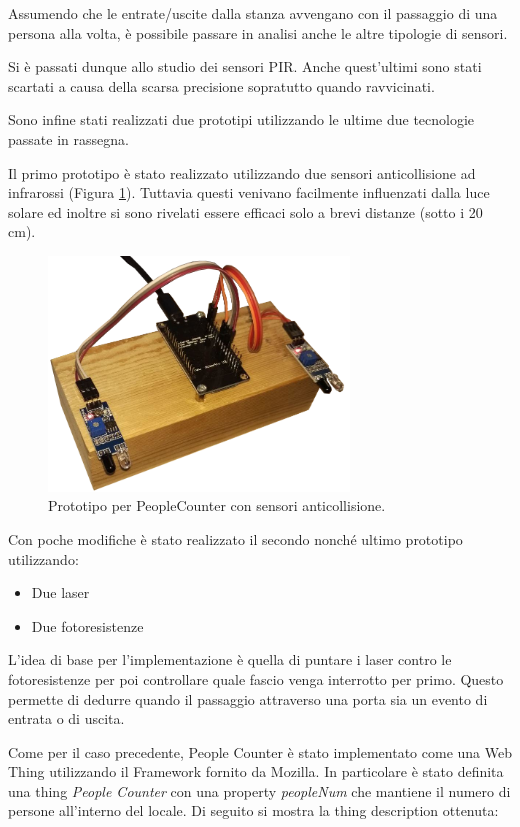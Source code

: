\documentclass{article}
\begin{document}
Assumendo che le entrate/uscite dalla stanza avvengano con il passaggio di una persona alla volta, è possibile passare in analisi anche le altre tipologie di sensori.

Si è passati dunque allo studio dei sensori PIR. Anche quest'ultimi sono stati scartati a causa della scarsa precisione sopratutto quando ravvicinati. 

Sono infine stati realizzati due prototipi utilizzando le ultime due tecnologie passate in rassegna.

Il primo prototipo è stato realizzato utilizzando due sensori anticollisione ad infrarossi (Figura \ref{fig:anticollision}).
Tuttavia questi venivano facilmente influenzati dalla luce solare ed inoltre si sono rivelati essere efficaci solo a brevi distanze (sotto i 20 cm).

\begin{figure}
    \centering
    \includegraphics[width=8cm]{img/ir_counter.png}
    \caption{Prototipo per PeopleCounter con sensori anticollisione.}
    \label{fig:anticollision}
\end{figure}

Con poche modifiche è stato realizzato il secondo nonché ultimo prototipo utilizzando:
\begin{itemize}
    \item Due laser
    \item Due fotoresistenze
\end{itemize}

L'idea di base per l'implementazione è quella di puntare i laser contro le fotoresistenze per poi controllare quale fascio venga interrotto per primo. Questo permette di dedurre quando il passaggio attraverso una porta sia un evento di entrata o di uscita.

Come per il caso precedente, People Counter è stato implementato come una Web Thing utilizzando il Framework fornito da Mozilla. In particolare è stato definita una thing \textit{People Counter} con una property \textit{peopleNum} che mantiene il numero di persone all'interno del locale.
Di seguito si mostra la thing description ottenuta:
\end{document}
